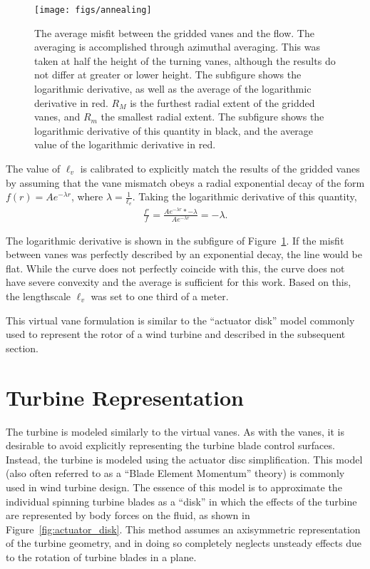    \begin{figure}[!htb]
    \centering
    \texttt{[image: figs/annealing]}
     \caption{The average misfit between the gridded vanes and the
    flow. The averaging is accomplished through azimuthal
    averaging. This was taken at half the height of the turning vanes,
    although the results do not differ at greater or lower height. 
    The subfigure shows the logarithmic derivative, as well as the
    average of the logarithmic derivative in red. 
    $R_{M}$ is the furthest radial extent of the gridded vanes,
    and $R_{m}$ the smallest radial extent. The subfigure shows the
    logarithmic derivative of this quantity in black, and the average
    value of the logarithmic derivative in red.}
     \label{fig:annealing}
   \end{figure}

The value of $\ell_v$ is calibrated to explicitly match the 
results of the gridded vanes by assuming that the vane mismatch 
obeys a radial exponential decay of the form $f(r) = A e^{-\lambda r}$, 
where $\lambda = \frac{1}{\ell_v}$.
Taking the logarithmic derivative of this quantity, 
\begin{eqnarray}
 \frac{f'}{f} = \frac{A e^{-\lambda r} * -\lambda}{A e^{-\lambda r}} =
  -\lambda. 
\end{eqnarray}

The logarithmic derivative is shown in the 
subfigure of Figure~\ref{fig:annealing}. If the misfit between vanes 
was perfectly described by an exponential decay, the line would be flat. 
While the curve does not perfectly coincide with this, the curve does
not have severe convexity and the average is sufficient for this
work. Based on this, the lengthscale $\ell_v$ was set to one third of a
meter. 


This virtual vane formulation is similar to the ``actuator disk'' model
commonly used to represent the rotor of a wind turbine and
described in the subsequent section. 

\section{Turbine Representation}
\label{sec:actuator_disk}
%
%

The turbine is modeled similarly to the virtual vanes. As with the
vanes, it is desirable to avoid explicitly representing the turbine
blade control surfaces. Instead, the turbine is modeled using the
actuator disc simplification. 
This model (also often referred to as a ``Blade Element Momentum''
theory) is commonly used in wind
turbine design\cite{shevell1983fundamentals,betz,leclerc}. The essence
of this model is to approximate the individual spinning turbine blades
as a ``disk'' in which the effects of the turbine are represented by
body forces on the fluid, as shown in Figure~\ref{fig:actuator_disk}.
This method assumes an axisymmetric representation of the turbine
geometry, and in doing so completely neglects unsteady effects due to
the rotation of turbine blades in a plane. 

